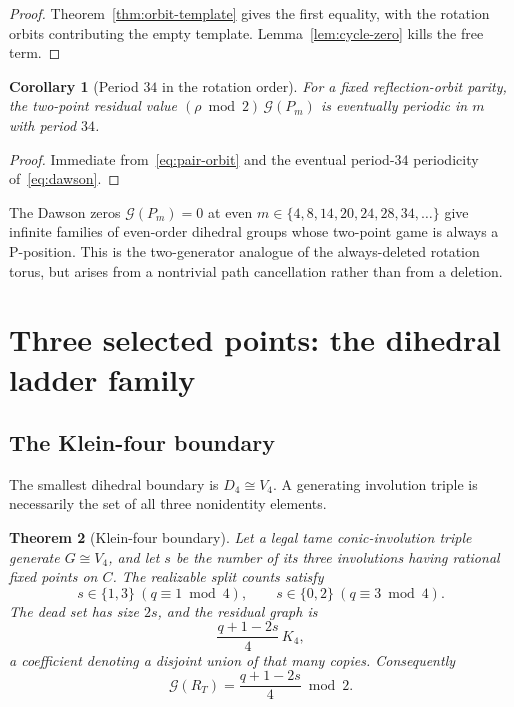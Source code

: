 \documentclass[11pt]{article}
\newtheorem{theorem}{Theorem}[section]
\newtheorem{corollary}[theorem]{Corollary}
\theoremstyle{definition}
\theoremstyle{remark}
\newcommand{\Grundy}{\mathcal{G}}
\begin{document}
\begin{proof}
Theorem~\ref{thm:orbit-template} gives the first equality, with the rotation orbits contributing the
empty template. Lemma~\ref{lem:cycle-zero} kills the free term.
\end{proof}

\begin{corollary}[Period $34$ in the rotation order]
\label{cor:period34}
For a fixed reflection-orbit parity, the two-point residual value $(\rho\bmod2)\,\Grundy(P_m)$ is
eventually periodic in $m$ with period $34$.
\end{corollary}

\begin{proof}
Immediate from~\eqref{eq:pair-orbit} and the eventual period-$34$ periodicity
of~\eqref{eq:dawson}.
\end{proof}

The Dawson zeros $\Grundy(P_m)=0$ at even $m\in\{4,8,14,20,24,28,34,\dots\}$ give infinite families
of even-order dihedral groups whose two-point game is always a P-position. This is the
two-generator analogue of the always-deleted rotation torus, but arises from a nontrivial path
cancellation rather than from a deletion.

\section{Three selected points: the dihedral ladder family}
\label{sec:triples}

\subsection{The Klein-four boundary}

The smallest dihedral boundary is $D_4\cong V_4$. A generating involution triple is necessarily the
set of all three nonidentity elements.

\begin{theorem}[Klein-four boundary]
\label{thm:v4}
Let a legal tame conic-involution triple generate $G\cong V_4$, and let $s$ be the number of its
three involutions having rational fixed points on $C$. The realizable split counts satisfy
\begin{equation}
  s\in\{1,3\}\ (q\equiv1\bmod4),
  \qquad
  s\in\{0,2\}\ (q\equiv3\bmod4).
  \label{eq:v4-split}
\end{equation}
The dead set has size $2s$, and the residual graph is
\begin{equation}
  \frac{q+1-2s}{4}\,K_4 ,
  \label{eq:v4-graph}
\end{equation}
a coefficient denoting a disjoint union of that many copies. Consequently
\begin{equation}
  \Grundy(R_T)=\frac{q+1-2s}{4}\bmod2 .
  \label{eq:v4-value}
\end{equation}
\end{theorem}
\end{document}
